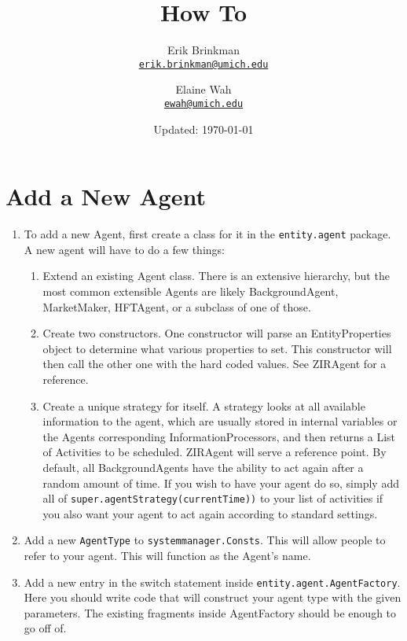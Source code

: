 \documentclass[11pt]{article}
\newcommand{\email}[1]{\href{mailto:#1}{\texttt{#1}}}
\begin{document}
	
\title{How To}
\author{
  Erik Brinkman \\
  \email{erik.brinkman@umich.edu}
  \and
  Elaine Wah \\
  \email{ewah@umich.edu}
}
\date{Updated: \today}
\maketitle

\tableofcontents

\section{Add a New Agent}

\begin{enumerate}[1)]
\item To add a new Agent, first create a class for it in the
  \texttt{entity.agent} package. A new agent will have to do a few things:
  \begin{enumerate}[1.]
  \item Extend an existing Agent class. There is an extensive hierarchy, but the
    most common extensible Agents are likely BackgroundAgent, MarketMaker,
    HFTAgent, or a subclass of one of those.
  \item Create two constructors. One constructor will parse an EntityProperties
    object to determine what various properties to set. This constructor will
    then call the other one with the hard coded values. See ZIRAgent for a
    reference.
  \item Create a unique strategy for itself. A strategy looks at all available
    information to the agent, which are usually stored in internal variables or
    the Agents corresponding InformationProcessors, and then returns a List of
    Activities to be scheduled. ZIRAgent will serve a reference point. By
    default, all BackgroundAgents have the ability to act again after a random
    amount of time. If you wish to have your agent do so, simply add all of
    \texttt{super.agentStrategy(currentTime))} to your list of activities if you
    also want your agent to act again according to standard settings.
  \end{enumerate}
\item Add a new \texttt{AgentType} to \texttt{systemmanager.Consts}. This will
  allow people to refer to your agent. This will function as the Agent's name.
\item Add a new entry in the switch statement inside
  \texttt{entity.agent.AgentFactory}. Here you should write code that will
  construct your agent type with the given parameters. The existing fragments
  inside AgentFactory should be enough to go off of.
\end{enumerate}
\end{document}
